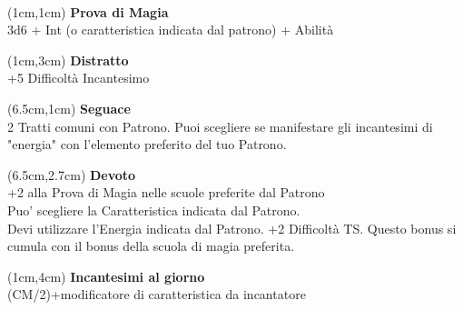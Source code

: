 \documentclass[a4paper,12 pt,openany]{book}
\begin{document}
	~\newpage

\begin{textblock*}{5cm}(1cm,1cm) %
		\textbf{Prova di Magia}\\
3d6 + Int (o caratteristica indicata dal patrono) + Abilità		
	\end{textblock*}

\begin{textblock*}{5cm}(1cm,3cm) %
	\textbf{Distratto}\\
	+5 Difficoltà Incantesimo
\end{textblock*}

\begin{textblock*}{13.5cm}(6.5cm,1cm) %
	\textbf{Seguace}\\
2 Tratti comuni con Patrono. Puoi scegliere se manifestare gli incantesimi di "energia" con l'elemento preferito del tuo Patrono.\\
\end{textblock*}

\begin{textblock*}{13.5cm}(6.5cm,2.7cm) %
	\textbf{Devoto}\\
+2 alla Prova di Magia nelle scuole preferite dal Patrono\\
Puo' scegliere la Caratteristica indicata dal Patrono.\\
Devi utilizzare l'Energia indicata dal Patrono. +2 Difficoltà TS. Questo bonus si cumula con il bonus della scuola di magia preferita.
\end{textblock*}
	
\begin{textblock*}{5cm}(1cm,4cm) %
\textbf{Incantesimi al giorno}\\
(CM/2)+modificatore di caratteristica da incantatore
\end{textblock*}	
	 


	 

	 	~\newpage


	
\end{document}
